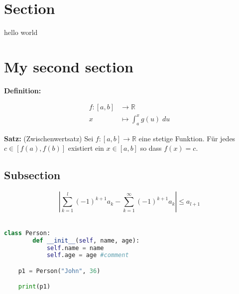 \documentclass[11pt, a4paper]{article}
\begin{document}
	
	\setformat
	
	\section*{Section}
	\begin{fullbox}
		hello world
	\end{fullbox}
	\section*{My second section}
	\textbf{Definition:} \lipsum[13]
	
	\begin{fullbox}
	 	\begin{align*}
	 		f:[a,b] &\rightarrow \mathbb{R}\\
	 		x &\mapsto \int_a^x g(u)\; du
	 	\end{align*}
	\end{fullbox}
	
	\begin{outline}
		\textbf{Satz:} (Zwischenwertsatz) Sei $f:[a,b]\rightarrow \mathbb R$ eine stetige Funktion. Für jedes $c \in [f(a),f(b)]$ existiert ein $x \in [a,b]$ so dass $f(x) = c$.  
	 
	\end{outline}
	 	
	\subsection*{Subsection}
	
	\[\left| \sum_{k=1}^l (-1)^{k+1} a_k -\sum_{k=1}^\infty (-1)^{k+1} a_k\right| \leq a_{l+1}\]\
	
	\pagebreak
	
	\begin{lstlisting}[language=Python]
	class Person:
  		def __init__(self, name, age):
    		self.name = name
    		self.age = age #comment

	p1 = Person("John", 36)

	print(p1)\end{lstlisting}
	
\end{document}
